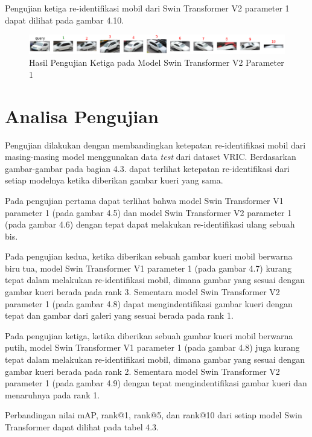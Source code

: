 Pengujian ketiga re-identifikasi mobil dari Swin Transformer V2 parameter 1 dapat dilihat pada gambar 4.10.

\begin{figure}[ht]
  \centering
  \includegraphics[scale=0.6]{gambar/Que61V2P1IT1.png}
  \caption{Hasil Pengujian Ketiga pada Model Swin Transformer V2 Parameter 1}
  \label{fig:hasilpengujianketigapadamodelswintransformerv2param1}
\end{figure}

\section{Analisa Pengujian}
\label{sec:analisapengujian}

Pengujian dilakukan dengan membandingkan ketepatan re-identifikasi mobil dari masing-masing model menggunakan 
data \emph{test} dari dataset VRIC. Berdasarkan gambar-gambar pada bagian 4.3. dapat terlihat ketepatan 
re-identifikasi dari setiap modelnya ketika diberikan gambar kueri yang sama. 

Pada pengujian pertama dapat terlihat bahwa model Swin Transformer V1 parameter 1 (pada gambar 4.5) 
dan model Swin Transformer V2 parameter 1 (pada gambar 4.6) dengan tepat dapat melakukan re-identifikasi 
ulang sebuah bis.

Pada pengujian kedua, ketika diberikan sebuah gambar kueri mobil berwarna biru tua, model Swin Transformer V1 
parameter 1 (pada gambar 4.7) kurang tepat dalam melakukan re-identifikasi mobil, dimana gambar yang sesuai 
dengan gambar kueri berada pada rank 3. Sementara model Swin Transformer V2 parameter 1 (pada gambar 4.8) dapat 
mengindentifikasi gambar kueri dengan tepat dan gambar dari galeri yang sesuai berada pada rank 1.

Pada pengujian ketiga, ketika diberikan sebuah gambar kueri mobil berwarna putih, model Swin Transformer V1 
parameter 1 (pada gambar 4.8) juga kurang tepat dalam melakukan re-identifikasi mobil, dimana gambar yang sesuai 
dengan gambar kueri berada pada rank 2. Sementara model Swin Transformer V2 parameter 1 (pada gambar 4.9) dengan 
tepat mengindentifikasi gambar kueri dan menaruhnya pada rank 1.

Perbandingan nilai mAP, rank@1, rank@5, dan rank@10 dari setiap model Swin Transformer dapat dilihat pada tabel 
4.3.

